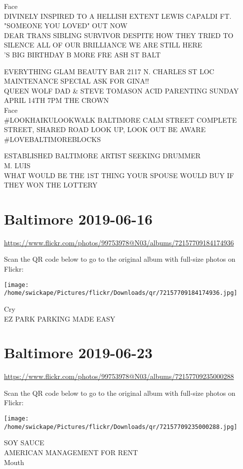 \documentclass[10pt,letterpaper]{article}
\begin{document}
Face\\
DIVINELY INSPIRED TO A HELLISH EXTENT LEWIS CAPALDI FT. "SOMEONE YOU LOVED" OUT NOW\\
DEAR TRANS SIBLING SURVIVOR DESPITE HOW THEY TRIED TO SILENCE ALL OF OUR BRILLIANCE WE ARE STILL HERE\\
'S BIG BIRTHDAY B MORE FRE ASH ST BALT

EVERYTHING GLAM BEAUTY BAR 2117 N. CHARLES ST LOC MAINTENANCE SPECIAL ASK FOR GINA!!\\
QUEEN WOLF DAD \& STEVE TOMASON ACID PARENTING SUNDAY APRIL 14TH 7PM THE CROWN\\
Face\\
\#LOOKHAIKULOOKWALK BALTIMORE CALM STREET COMPLETE STREET, SHARED ROAD LOOK UP, LOOK OUT BE AWARE \#LOVEBALTIMOREBLOCKS

ESTABLISHED BALTIMORE ARTIST SEEKING DRUMMER\\
M. LUIS\\
WHAT WOULD BE THE 1ST THING YOUR SPOUSE WOULD BUY IF THEY WON THE LOTTERY
\pagebreak

\section*{Baltimore 2019-06-16}

\url{https://www.flickr.com/photos/99753978@N03/albums/72157709184174936}

Scan the QR code below to go to the original album with full-size photos on Flickr:

\texttt{[image: /home/swickape/Pictures/flickr/Downloads/qr/72157709184174936.jpg]}
\pagebreak

Cry\\
EZ PARK PARKING MADE EASY
\pagebreak

\section*{Baltimore 2019-06-23}

\url{https://www.flickr.com/photos/99753978@N03/albums/72157709235000288}

Scan the QR code below to go to the original album with full-size photos on Flickr:

\texttt{[image: /home/swickape/Pictures/flickr/Downloads/qr/72157709235000288.jpg]}
\pagebreak

SOY SAUCE\\
AMERICAN MANAGEMENT FOR RENT\\
Mouth
\end{document}
